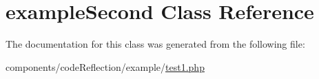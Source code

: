 \hypertarget{classexample_second}{
\section{exampleSecond Class Reference}
\label{classexample_second}
}


The documentation for this class was generated from the following file:\begin{CompactItemize}
\item 
components/codeReflection/example/\hyperlink{code_reflection_2example_2test1_8php}{test1.php}\end{CompactItemize}
